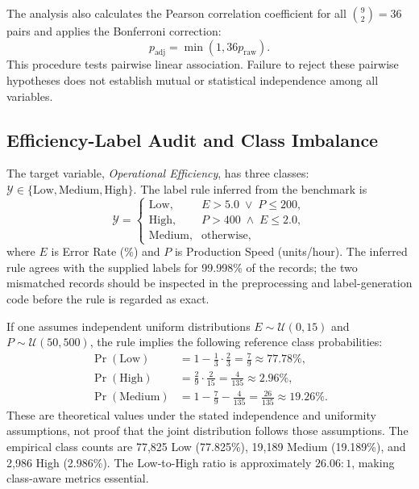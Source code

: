 \documentclass[conference]{IEEEtran}
\begin{document}
The analysis also calculates the Pearson correlation coefficient for all $\binom{9}{2} = 36$ pairs and applies the Bonferroni correction:
\begin{equation}
p_{\text{adj}} = \min(1, 36 p_{\text{raw}}).
\label{eq:bonferroni}
\end{equation}
This procedure tests pairwise linear association. Failure to reject these pairwise hypotheses does not establish mutual or statistical independence among all variables.

\subsection{Efficiency-Label Audit and Class Imbalance}
The target variable, \textit{Operational Efficiency}, has three classes: $\mathcal{Y} \in \{\text{Low}, \text{Medium}, \text{High}\}$. The label rule inferred from the benchmark is
\begin{equation}
\mathcal{Y} = 
\begin{cases}
\text{Low}, & E > 5.0 \;\lor\; P \le 200, \\
\text{High}, & P > 400 \;\land\; E \le 2.0, \\
\text{Medium}, & \text{otherwise},
\end{cases}
\label{eq:label_rule}
\end{equation}
where $E$ is Error Rate (\%) and $P$ is Production Speed (units/hour). The inferred rule agrees with the supplied labels for 99.998\% of the records; the two mismatched records should be inspected in the preprocessing and label-generation code before the rule is regarded as exact.

If one assumes independent uniform distributions $E \sim \mathcal{U}(0, 15)$ and $P \sim \mathcal{U}(50, 500)$, the rule implies the following reference class probabilities:
\begin{equation}
\begin{aligned}
\Pr(\text{Low}) &= 1 - \frac{1}{3}\cdot\frac{2}{3} = \frac{7}{9} \approx 77.78\%, \\
\Pr(\text{High}) &= \frac{2}{9}\cdot\frac{2}{15} = \frac{4}{135} \approx 2.96\%, \\
\Pr(\text{Medium}) &= 1 - \frac{7}{9} - \frac{4}{135} = \frac{26}{135} \approx 19.26\%.
\end{aligned}
\label{eq:probs}
\end{equation}
These are theoretical values under the stated independence and uniformity assumptions, not proof that the joint distribution follows those assumptions. The empirical class counts are 77,825 Low (77.825\%), 19,189 Medium (19.189\%), and 2,986 High (2.986\%). The Low-to-High ratio is approximately $26.06 : 1$, making class-aware metrics essential.
\end{document}
